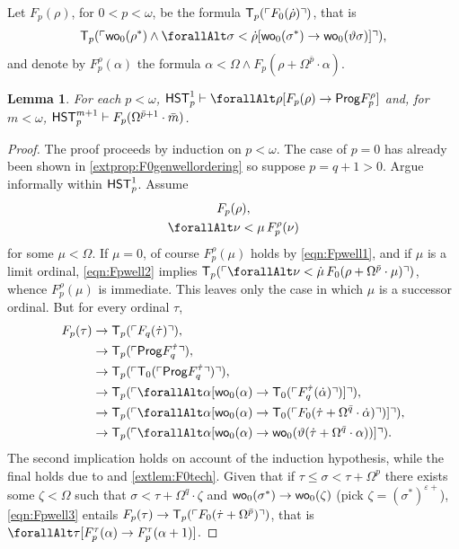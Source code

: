 \documentclass[UKenglish,cleveref,DIV=12]{scrartcl}
\let\forall\forallAlt
\newtheorem{lemma}{Lemma}
\theoremstyle{definition}
\theoremstyle{definition}
\begin{document}
Let $F_p(\rho)$, for $0<p<\omega$, be the formula $\mathsf{T}_p(\ulcorner{F_0(\dot\rho)}\urcorner)$, that is
\begin{align*}
 \T_{p}(\gn{\wo_0(\rho^*)\land\forall\sigma<\dot\rho [\wo_0(\sigma^*)\rightarrow\wo_0(\vartheta\sigma)]}),
\end{align*}
and denote by $F_p^\rho(\alpha)$ the formula $\alpha<\Omega\land F_p(\rho+\Omega^{\bar p}\cdot\alpha)$.
\begin{lemma}\label{extlem:Fpwellordering1}
 For each $p<\omega$, $\HST_p^1\proves \forall\rho[F_p(\rho)\rightarrow\Prog F_p^{\rho}]$ and, for $m<\omega$, $\mathsf{HST}_p^{m+1}\vdash F_p(\Omega^{\bar p+1}\cdot\bar m)$.
\end{lemma}
\begin{proof} The proof proceeds by induction on $p<\omega$. The case of $p=0$
has already been shown in \cref{extprop:F0genwellordering} so suppose $p=q+1>0$.
Argue informally within $\mathsf{HST}_p^1$. Assume
\begin{gather}
 F_p(\rho),\label{eqn:Fpwell1}\\
 \forall\nu<\mu\,F_p^\rho(\nu)\label{eqn:Fpwell2}
\end{gather}
for some $\mu<\Omega$. If $\mu=0$, of course $F_p^\rho(\mu)$ holds by
\cref{eqn:Fpwell1}, and if $\mu$ is a limit ordinal, \cref{eqn:Fpwell2}
implies $\T_p(\gn{\forall\nu<\dot\mu\,F_0(\rho+\Omega^{\bar p}\cdot\mu)})$,
whence $F_p^\rho(\mu)$ is immediate. This leaves only the case in which $\mu$ is a
successor ordinal. But for every ordinal $\tau$,
\begin{align}\label{eqn:Fpwell3}
\begin{split}
  F_p(\tau) &\rightarrow \T_p(\gn{F_q(\dot\tau)}), \\
	  &\rightarrow \T_p(\gn{\Prog F_q^{\dot\tau}}),\\
	  &\rightarrow \T_p(\gn{\T_0(\gn{\Prog F_q^{\dot\tau}})}),\\
	  &\rightarrow \T_p(\gn{\forall\alpha[\wo_0(\alpha)\rightarrow \T_0(\gn{F_q^{\dot\tau}(\dot\alpha)})]}),\\
	  &\rightarrow \T_p(\gn{\forall\alpha[\wo_0(\alpha)\rightarrow \T_0(\gn{F_0(\dot\tau+\Omega^{\bar q}\cdot\dot\alpha)})]}),\\
	  &\rightarrow \T_p(\gn{\forall\alpha[\wo_0(\alpha)\rightarrow\wo_0(\vartheta(\dot\tau+\Omega^{\bar q}\cdot\alpha))]}).
	  \end{split}
\end{align}
The second implication holds on account of the induction hypothesis, while the
final holds due to  and \cref{extlem:F0tech}. Given that if
$\tau\le\sigma<\tau+\Omega^{p}$ there exists
some $\zeta<\Omega$ such that $\sigma<\tau+\Omega^q\cdot\zeta$ and
$\mathsf{wo}_0(\sigma^*)\rightarrow\mathsf{wo}_0(\zeta)$ (pick
$\zeta=(\sigma^*)^{\varepsilon+}$), \cref{eqn:Fpwell3}
entails $F_p(\tau)\rightarrow\mathsf{T}_p(\ulcorner{F_0(\dot\tau+\Omega^{\bar p})}\urcorner)$,
that is $\forall\tau[F_p^\tau(\alpha)\rightarrow F_p^\tau(\alpha+1)]$.


\end{proof}
\end{document}
